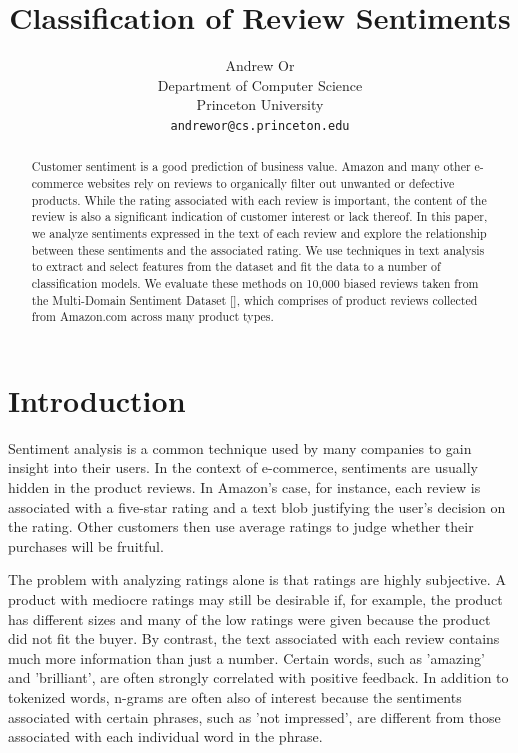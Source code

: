 \documentclass{article} %
\title{Classification of Review Sentiments}
\author{
Andrew Or\\
Department of Computer Science\\
Princeton University\\
\texttt{andrewor@cs.princeton.edu} \\
}
\begin{document}
\maketitle

\begin{abstract}

Customer sentiment is a good prediction of business value. Amazon and many other e-commerce websites rely on reviews to organically filter out unwanted or defective products. While the rating associated with each review is important, the content of the review is also a significant indication of customer interest or lack thereof. In this paper, we analyze sentiments expressed in the text of each review and explore the relationship between these sentiments and the associated rating. We use techniques in text analysis to extract and select features from the dataset and fit the data to a number of classification models. We evaluate these methods on 10,000 biased reviews taken from the Multi-Domain Sentiment Dataset [], which comprises of product reviews collected from Amazon.com across many product types.

\end{abstract}
\section{Introduction}

Sentiment analysis is a common technique used by many companies to gain insight into their users. In the context of e-commerce, sentiments are usually hidden in the product reviews. In Amazon's case, for instance, each review is associated with a five-star rating and a text blob justifying the user's decision on the rating. Other customers then use average ratings to judge whether their purchases will be fruitful.

The problem with analyzing ratings alone is that ratings are highly subjective. A product with mediocre ratings may still be desirable if, for example, the product has different sizes and many of the low ratings were given because the product did not fit the buyer. By contrast, the text associated with each review contains much more information than just a number. Certain words, such as 'amazing' and 'brilliant', are often strongly correlated with positive feedback. In addition to tokenized words, n-grams are often also of interest because the sentiments associated with certain phrases, such as 'not impressed', are different from those associated with each individual word in the phrase.
\end{document}
